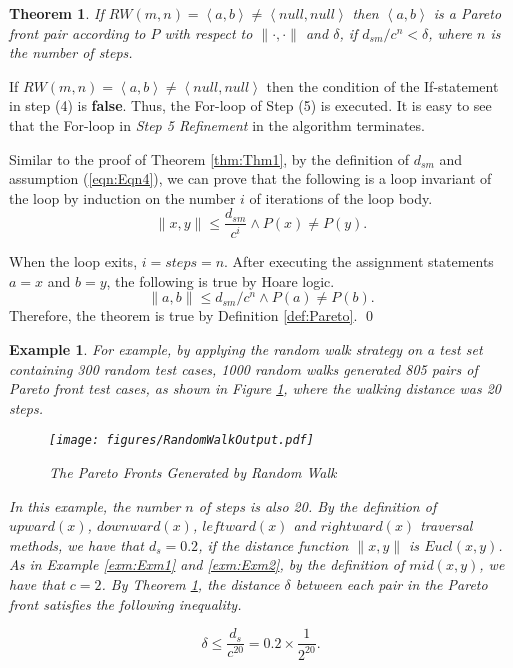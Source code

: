 \documentclass[preprint,1p,authoryear,times]{elsarticle}
\newtheorem{Theorem} {Theorem}
\newtheorem{Example}{Example}
\begin{document}
\begin{Theorem}\label{thm:Thm3}
If $RW(m,n)=\left< a, b \right> \neq \left< null, null \right>$ then $\left< a ,b \right>$ is a Pareto front pair according to $P$ with respect to $\|\cdot,\cdot\|$ and  $\delta$, if $d_{sm}/c^n < \delta$, where $n$ is the number of steps. 
\end{Theorem}
If $RW(m,n)=\left<a, b \right> \neq \left< null, null \right>$ then the condition of the If-statement in step (4) is \textbf{false}. Thus, the For-loop of Step (5) is executed. It is easy to see that the For-loop in \emph{Step 5 Refinement} in the algorithm terminates. 

Similar to the proof of Theorem \ref{thm:Thm1}, by the definition of $d_{sm}$ and assumption (\ref{eqn:Eqn4}), we can prove that the following is a loop invariant of the loop by induction on the number $i$ of iterations of the loop body. 
\[\|x,y\| \leq \frac{d_{sm}}{c^i} \wedge P(x) \neq P(y).\] 

When the loop exits, $i = steps=n$. After executing the assignment statements $a=x$ and $b=y$, the following is true by Hoare logic. 
\[\|a,b\| \leq d_{sm}/c^n \wedge P(a) \neq P(b).\] 
Therefore, the theorem is true by Definition \ref{def:Pareto}. 
\qed

\begin{Example}\label{exm:Exm3}
For example, by applying the random walk strategy on a test set containing 300 random test cases, 1000 random walks generated 805 pairs of Pareto front test cases, as shown in Figure \ref{fig:RandomWalkResult}, where the walking distance was 20 steps. 
 
\begin{figure}[htbp]
	\centering
	\texttt{[image: figures/RandomWalkOutput.pdf]}\\
	\caption{The Pareto Fronts Generated by Random Walk}
	\label{fig:RandomWalkResult}
\end{figure}

In this example, the number $n$ of steps is also 20. By the definition of $upward(x)$, $downward(x)$, $leftward(x)$ and $rightward(x)$ traversal methods, we have that $d_s=0.2$, if the distance function $\|x,y\|$ is $Eucl(x,y)$. As in Example \ref{exm:Exm1} and \ref{exm:Exm2}, by the definition of $mid(x,y)$, we have that $c=2$. By Theorem \ref{thm:Thm3}, the distance $\delta$ between each pair in the Pareto front satisfies the following inequality.  

\[\delta \leq \frac{d_s}{c^{20}} = 0.2 \times \frac{1}{2^{20}}. \] 

\end{Example}
\end{document}
